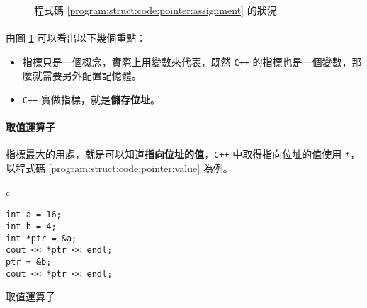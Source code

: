 \documentclass[12pt,a4paper,oneside]{article}
\begin{document}
\begin{CJK}{UTF8}{bkai}
\begin{figure}[h!]
\centering
{}
\caption{程式碼 \ref{program:struct:code:pointer:assignment} 的狀況}
\label{program:struct:fig:pointer:assignment}
\end{figure}

\paragraph{}由圖 \ref{program:struct:fig:pointer:assignment} 可以看出以下幾個重點：
\begin{itemize}
\item 指標只是一個概念，實際上用變數來代表，既然 \texttt{C++} 的指標也是一個變數，那麼就需要另外配置記憶體。
\item \texttt{C++} 實做指標，就是{\color{blue}\textbf{儲存位址}}。
\end{itemize}

\paragraph{取值運算子}指標最大的用處，就是可以知道{\color{red}\textbf{指向位址的值}}，\texttt{C++} 中取得指向位址的值使用 \lstinline!*!，以程式碼 \ref{program:struct:code:pointer:value} 為例。

\begin{code}[h!]
\centering
\begin{tabular}{c}
\begin{lstlisting}
int a = 16;
int b = 4;
int *ptr = &a;
cout << *ptr << endl;
ptr = &b;
cout << *ptr << endl;
\end{lstlisting}
\end{tabular}
\caption{取值運算子}
\label{program:struct:code:pointer:value}
\end{code}


\end{CJK}
\end{document}
